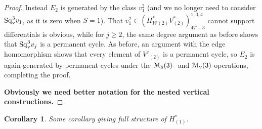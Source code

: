 \documentclass[11pt]{amsart}
\theoremstyle{plain}
\newtheorem{cor}[thm]{Corollary}
\theoremstyle{definition}
\newcommand{\calW}{\mathcal{W}}
\newcommand{\calM}{\mathcal{M}}
\newcommand{\calmv}{\mathcal{M}_\textup{v}}
\newcommand{\calmh}{\mathcal{M}_\textup{h}}
\newcommand{\calMv}{\mathcal{M}_\textup{v}}
\theoremstyle{plain}
\newcommand{\Sqv}{\mathrm{Sq}_\textup{v}}
\newcommand{\F}{\mathbb{F}}
\begin{document}
\begin{Calculations of HWn for n nonzero}
\begin{proof}
Instead $E_2$ is generated by the class $v_1^{2}$  (and we no longer need to consider $\Sqv^{3}v_1$, as it is zero when $S=1$). That $v_1^2\in(H^*_{\calW(2)}V^*_{(2)})^{1,0,4}_{4T-3}$ cannot support differentials is obvious, while for $j\geq2$, the same degree argument as before shows that $\Sqv^3v_j$ is a permanent cycle. As before, an argument with the edge homomorphism shows that every element of $V'_{(2)}$ is a permanent cycle, so $E_2$ is again generated by permanent cycles under the $\calmh(3)$- and $\calmv(3)$-operations, completing the proof.

 \textbf{Obviously we need better notation for the nested vertical constructions.}
\end{proof}

\begin{cor}
Some corollary giving full structure of $H^*_{(1)}$.
\end{cor}




\end{Calculations of HWn for n nonzero}
\end{document}
